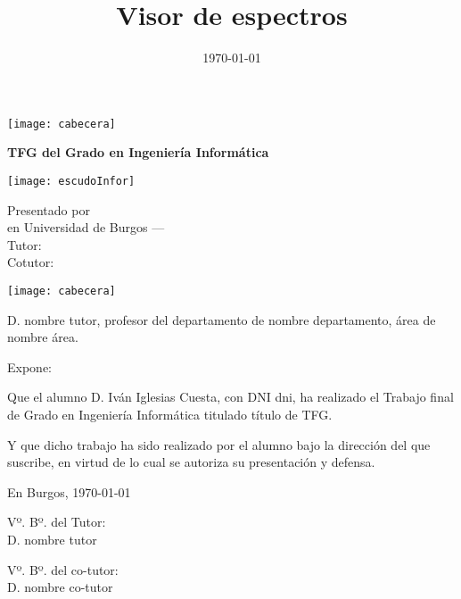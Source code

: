\documentclass[a4paper,12pt,twoside]{memoir}
\title{Visor de espectros}
\author{\nombre}
\date{\today}
\makeatletter
\def\maketitle{
	\null
	\thispagestyle{empty}
	\noindent\texttt{[image: cabecera]}\vspace{1cm}%
	\vfill
	\colorbox{cpardoBox}{%
		\begin{minipage}{.8\textwidth}
			\vspace{.5cm}\Large
			\begin{center}
				\textbf{TFG del Grado en Ingeniería Informática}\vspace{.6cm}\\
				\textbf{\LARGE\@title{}}
			\end{center}
			\vspace{.2cm}
		\end{minipage}
		
	}%
	\hfill\begin{minipage}{.20\textwidth}
		\texttt{[image: escudoInfor]}
	\end{minipage}
	\vfill
	\begin{center}%
		{%
			\noindent\LARGE
			Presentado por \@author{}\\ 
			en Universidad de Burgos --- \@date{}\\
			Tutor: \@tutor{}\\
			Cotutor: \@cotutor{}\\
		}%
	\end{center}%
	\null
	\cleardoublepage
}
\newcommand{\nombre}{Iván Iglesias Cuesta} %
\makeatother
\begin{document}
	
	\maketitle
	
	
	\newpage\null\thispagestyle{empty}\newpage
	
	
	
	\thispagestyle{empty}
	
	
	\noindent\texttt{[image: cabecera]}\vspace{1cm}
	
	\noindent D. nombre tutor, profesor del departamento de nombre departamento,
	área de nombre área.
	
	\noindent Expone:
	
	\noindent Que el alumno D. \nombre, con DNI dni, ha realizado el Trabajo final
	de Grado en Ingeniería Informática titulado título de TFG. 
	
	\noindent Y que dicho trabajo ha sido realizado por el alumno bajo la dirección
	del que suscribe, en virtud de lo cual se autoriza su presentación y defensa.
	
	\begin{center} %
		En Burgos, {\large \today}
	\end{center}
	
	\vfill\vfill\vfill
	
	\begin{minipage}{0.45\textwidth}
		\begin{flushleft} %
			Vº. Bº. del Tutor:\\[2cm]
			D. nombre tutor
		\end{flushleft}
	\end{minipage}
	\hfill
	\begin{minipage}{0.45\textwidth}
		\begin{flushleft} %
			Vº. Bº. del co-tutor:\\[2cm]
			D. nombre co-tutor
		\end{flushleft}
	\end{minipage}
	\hfill
	
	\vfill
	
	
	
	\newpage\null\thispagestyle{empty}\newpage
	
\end{document}
